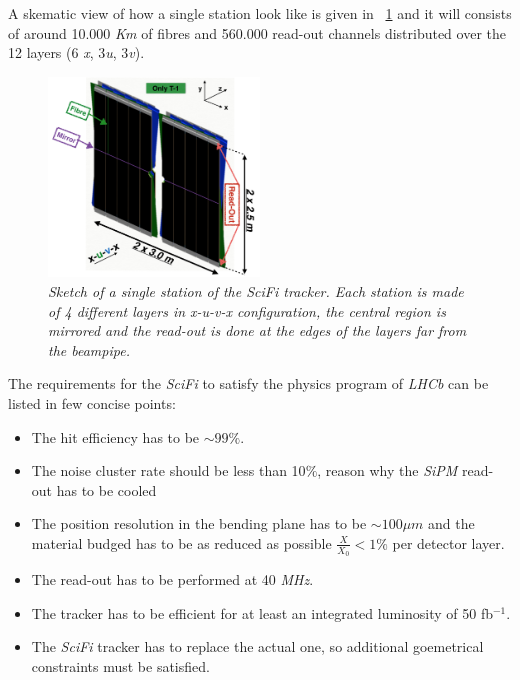 \documentclass[paper=a4, fontsize=10pt]{scrartcl}
\numberwithin{equation}{section}		%
\numberwithin{figure}{section}			%
\numberwithin{table}{section}				%
\begin{document}
A skematic view of how a single station look like is given in ~\ref{Fig:SciFi} and it will consists of around 10.000 \textit{Km} of fibres and 560.000 read-out channels distributed over the 12 layers (6 \textit{x}, 3\textit{u}, 3\textit{v}).
\begin{figure}[h]
  \begin{center}
    \includegraphics[width=0.5\textwidth]{Images/ModuleSciFi.png} 
  \caption[Caption for track type]{\emph{Sketch of a single station of the SciFi tracker. Each station is made of 4 different layers in x-u-v-x configuration, the central region is mirrored and the read-out is done at the edges of the layers far from the beampipe.}}\label{Fig:SciFi}
  \end{center}
\end{figure}

The requirements for the \textit{SciFi} to satisfy the physics program of \textit{LHCb} can be listed in few concise points: 
\begin{itemize} 
\item{The hit efficiency has to be $\sim 99 \%$.}
\item{The noise cluster rate should be less than 10$\%$, reason why the \textit{SiPM} read-out has to be cooled}\item{The position resolution in the bending plane has to be $\sim 100 \mu m$ and the material budged has to be as reduced as possible $\frac{X}{X_{0}}<1 \%$ per detector layer.}
\item{The read-out has to be performed at 40 \textit{MHz}.}
\item{The tracker has to be efficient for at least an integrated luminosity of 50 fb$^{-1}$.}
\item{The \textit{SciFi} tracker has to replace the actual one, so additional goemetrical constraints must be satisfied.}
\end{itemize}
\end{document}
